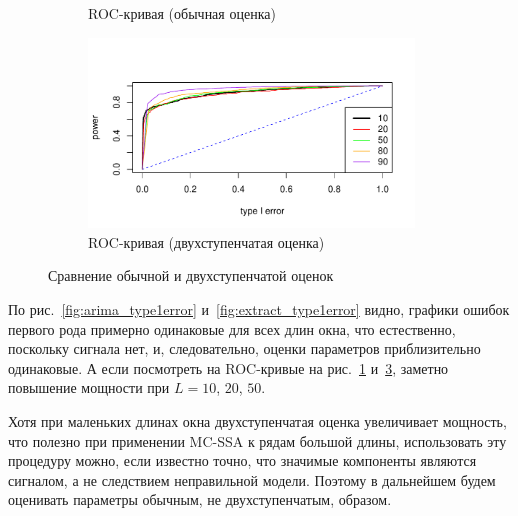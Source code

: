 \documentclass[specialist,
substylefile = spbu_report.rtx,
subf,href,colorlinks=true, 12pt]{disser}
\theoremstyle{definition}
\begin{document}
\begin{figure}[h!]
\begin{subfigure}[t]{0.5\textwidth}
		\caption{ROC-кривая (обычная оценка)}
		\label{fig:arima_roc}
	\end{subfigure}\hspace{\fill}
	\begin{subfigure}[t]{0.5\textwidth}
		\centering
		\includegraphics[width=0.95\textwidth]{img/roc_extract.pdf}
		\caption{ROC-кривая (двухступенчатая оценка)}
		\label{fig:extract_roc}
	\end{subfigure}
	\caption{Сравнение обычной и двухступенчатой оценок}
\end{figure}

По рис.~\ref{fig:arima_type1error} и~\ref{fig:extract_type1error} видно, графики ошибок первого рода примерно одинаковые для всех длин окна, что естественно, поскольку сигнала нет, и, следовательно, оценки параметров приблизительно одинаковые. А если посмотреть на ROC-кривые на рис.~\ref{fig:arima_roc} и~\ref{fig:extract_roc}, заметно повышение мощности при $L=10$, $20$, $50$. 

Хотя при маленьких длинах окна двухступенчатая оценка увеличивает мощность, что полезно при применении MC-SSA к рядам большой длины, использовать эту процедуру можно, если известно точно, что значимые компоненты являются сигналом, а не следствием неправильной модели. Поэтому в дальнейшем будем оценивать параметры обычным, не двухступенчатым, образом.
\end{document}
